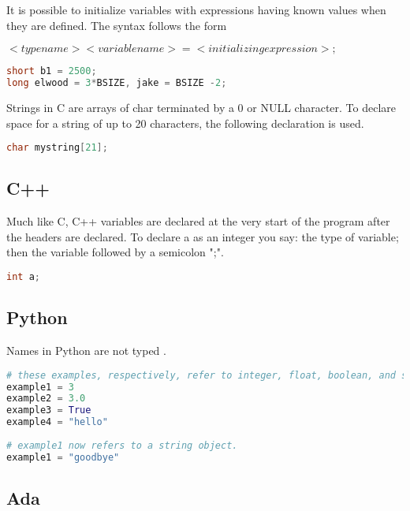\documentclass[12pt]{book}
\begin{document}
It is possible to initialize variables with expressions having known values when they are defined. The syntax follows the form 

$<typename> <variablename> = <initializing expression>;$

\lstset{style=mystyle}
\begin{lstlisting}[language=C, caption=C example]
short b1 = 2500;
long elwood = 3*BSIZE, jake = BSIZE -2;
\end{lstlisting}

Strings in C are arrays of char terminated by a 0 or NULL character. To declare space for a string of up to 20 characters, the following declaration is used.

\lstset{style=mystyle}
\begin{lstlisting}[language=C, caption=C example]
char mystring[21];
\end{lstlisting}


\subsection{C++}

Much like C, C++ variables are declared at the very start of the program after the headers are declared. To declare a as an integer you say: the type of variable; then the variable followed by a semicolon ";".


\lstset{style=mystyle}
\begin{lstlisting}[language=C++, caption=C++ example]
int a;
\end{lstlisting}




\newpage

\subsection{Python}

Names in Python are not typed .

\lstset{style=mystyle}
\begin{lstlisting}[language=Python, caption=Python example]
# these examples, respectively, refer to integer, float, boolean, and string objects
example1 = 3
example2 = 3.0
example3 = True
example4 = "hello"
 
# example1 now refers to a string object.
example1 = "goodbye"
\end{lstlisting}

\subsection{Ada}
\end{document}
